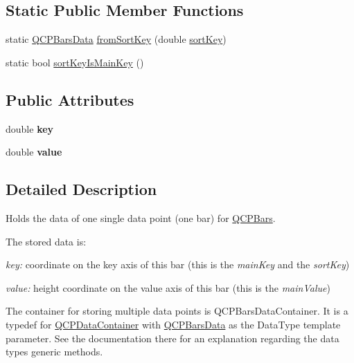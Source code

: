 \subsection*{Static Public Member Functions}
\begin{DoxyCompactItemize}
\item 
static \hyperlink{classQCPBarsData}{Q\+C\+P\+Bars\+Data} \hyperlink{classQCPBarsData_ad170d4e90498005ec319338910252ba8}{from\+Sort\+Key} (double \hyperlink{classQCPBarsData_aec71a3f55d0d52192ff9ad85b04ebf8d}{sort\+Key})
\item 
static bool \hyperlink{classQCPBarsData_aebaabda335bd4c9f81bd585d16b63aa8}{sort\+Key\+Is\+Main\+Key} ()
\end{DoxyCompactItemize}
\subsection*{Public Attributes}
\begin{DoxyCompactItemize}
\item 
double {\bfseries key}\hypertarget{classQCPBarsData_a09b492217dc03ee1c0348a2f2e6e0a04}{}\label{classQCPBarsData_a09b492217dc03ee1c0348a2f2e6e0a04}

\item 
double {\bfseries value}\hypertarget{classQCPBarsData_ab636644fb40630f3b1b72f44d65ec072}{}\label{classQCPBarsData_ab636644fb40630f3b1b72f44d65ec072}

\end{DoxyCompactItemize}


\subsection{Detailed Description}
Holds the data of one single data point (one bar) for \hyperlink{classQCPBars}{Q\+C\+P\+Bars}. 

The stored data is\+: \begin{DoxyItemize}
\item {\itshape key\+:} coordinate on the key axis of this bar (this is the {\itshape main\+Key} and the {\itshape sort\+Key}) \item {\itshape value\+:} height coordinate on the value axis of this bar (this is the {\itshape main\+Value})\end{DoxyItemize}
The container for storing multiple data points is Q\+C\+P\+Bars\+Data\+Container. It is a typedef for \hyperlink{classQCPDataContainer}{Q\+C\+P\+Data\+Container} with \hyperlink{classQCPBarsData}{Q\+C\+P\+Bars\+Data} as the Data\+Type template parameter. See the documentation there for an explanation regarding the data type\textquotesingle{}s generic methods.

